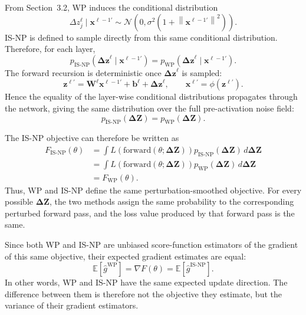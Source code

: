 From Section~3.2, WP induces the conditional distribution
\begin{equation}
\Delta z^\ell_j
\mid
\mathbf{x}^{\ell-1\prime}
\sim
\mathcal{N}
\left(
0,
\sigma^2
\left(1+
\left\|
\mathbf{x}^{\ell-1\prime}
\right\|^2\right)
\right).
\end{equation}
IS-NP is defined to sample directly from this same conditional distribution. Therefore, for each layer,
\begin{equation}
p_{\mathrm{IS\text{-}NP}}
\left(
\boldsymbol{\Delta z}^{\ell}
\mid
\mathbf{x}^{\ell-1\prime}
\right)
=
p_{\mathrm{WP}}
\left(
\boldsymbol{\Delta z}^{\ell}
\mid
\mathbf{x}^{\ell-1\prime}
\right).
\end{equation}
The forward recursion is deterministic once $\boldsymbol{\Delta z}^{\ell}$ is sampled:
\begin{equation}
\mathbf{z}^{\ell\prime}
=
\mathbf{W}^\ell \mathbf{x}^{\ell-1\prime}
+
\mathbf{b}^\ell
+
\boldsymbol{\Delta z}^{\ell},
\qquad
\mathbf{x}^{\ell\prime}
=
\phi(\mathbf{z}^{\ell\prime}).
\end{equation}
Hence the equality of the layer-wise conditional distributions propagates through the network, giving the same distribution over the full pre-activation noise field:
\begin{equation}
p_{\mathrm{IS\text{-}NP}}(\boldsymbol{\Delta Z})
=
p_{\mathrm{WP}}(\boldsymbol{\Delta Z}).
\end{equation}

The IS-NP objective can therefore be written as
\begin{align}
F_{\mathrm{IS\text{-}NP}}(\theta)
&=
\int
L\!\left(\mathrm{forward}(\theta;\boldsymbol{\Delta Z})\right)
p_{\mathrm{IS\text{-}NP}}(\boldsymbol{\Delta Z})
\,d\boldsymbol{\Delta Z} \\
&=
\int
L\!\left(\mathrm{forward}(\theta;\boldsymbol{\Delta Z})\right)
p_{\mathrm{WP}}(\boldsymbol{\Delta Z})
\,d\boldsymbol{\Delta Z} \\
&=
F_{\mathrm{WP}}(\theta).
\end{align}
Thus, WP and IS-NP define the same perturbation-smoothed objective. For every possible $\boldsymbol{\Delta Z}$, the two methods assign the same probability to the corresponding perturbed forward pass, and the loss value produced by that forward pass is the same.

Since both WP and IS-NP are unbiased score-function estimators of the gradient of this same objective, their expected gradient estimates are equal:
\begin{equation}
\mathbb{E}
\left[
\widehat{g}^{\mathrm{WP}}
\right]
=
\nabla F(\theta)
=
\mathbb{E}
\left[
\widehat{g}^{\mathrm{IS\text{-}NP}}
\right].
\end{equation}
In other words, WP and IS-NP have the same expected update direction. The difference between them is therefore not the objective they estimate, but the variance of their gradient estimators.


